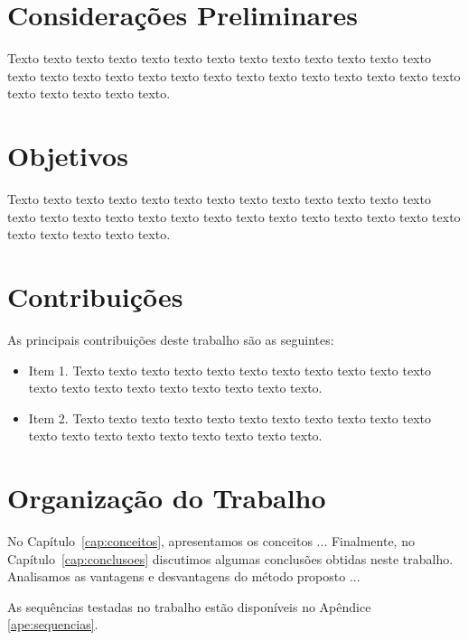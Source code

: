 \section{Considerações Preliminares}
\label{sec:consideracoes_preliminares}


 Texto texto texto texto texto texto texto texto texto texto texto texto texto
texto texto texto texto texto texto texto texto texto texto texto texto texto
texto texto texto texto texto texto.

\section{Objetivos}
\label{sec:objetivo}

Texto texto texto texto texto texto texto texto texto texto texto texto texto
texto texto texto texto texto texto texto texto texto texto texto texto texto
texto texto texto texto texto texto.

\section{Contribuições}
\label{sec:contribucoes}

As principais contribuições deste trabalho são as seguintes:

\begin{itemize}
  \item Item 1. Texto texto texto texto texto texto texto texto texto texto
  texto texto texto texto texto texto texto texto texto texto.

  \item Item 2. Texto texto texto texto texto texto texto texto texto texto
  texto texto texto texto texto texto texto texto texto texto.

\end{itemize}

\section{Organização do Trabalho}
\label{sec:organizacao_trabalho}

No Capítulo~\ref{cap:conceitos}, apresentamos os conceitos ... Finalmente, no
Capítulo~\ref{cap:conclusoes} discutimos algumas conclusões obtidas neste
trabalho. Analisamos as vantagens e desvantagens do método proposto ... 

As sequências testadas no trabalho estão disponíveis no Apêndice \ref{ape:sequencias}.
